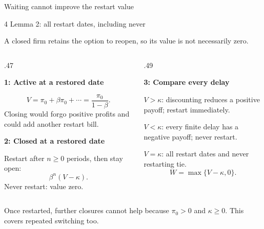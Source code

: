 \documentclass[aspectratio=169,11pt]{beamer}
\newcommand{\kwTurq}[1]{{\color{turquoise}#1}}
\newcommand{\labeltext}[1]{\par{\small\bfseries\color{blue}#1\par}\vspace{1.5mm}}
\newcommand{\takeaway}[1]{\par\vspace{2.5mm}\begingroup\setlength{\fboxsep}{2.5mm}\colorbox{pale}{\begin{minipage}{\dimexpr\linewidth-5mm\relax}\small\raggedright #1\end{minipage}}\endgroup\par}
\newcommand{\sectiontag}[1]{{\scriptsize\color{muted}#1\par}\vspace{2mm}}
\begin{document}
\begin{frame}{Waiting cannot improve the \kwTurq{restart value}}

\sectiontag{4 \textperiodcentered{} Lemma 2: all restart dates, including never}
{\small A closed firm retains the option to reopen, so its value is not necessarily zero.\par}\vspace{2mm}
\begin{columns}[T,onlytextwidth]
\begin{column}{.47\textwidth}
\labeltext{1: Active at a restored date}
\[V=\pi_0+\beta\pi_0+\cdots=\frac{\pi_0}{1-\beta}.\]
\small Closing would forgo positive profits and could add another restart bill.
\vspace{4mm}\labeltext{2: Closed at a restored date}
\small Restart after $n\geq0$ periods, then stay open:
\[\beta^n(V-\kappa).\]
Never restart: value zero.
\end{column}
\begin{column}{.49\textwidth}
\labeltext{3: Compare every delay}
\small $V>\kappa$: discounting reduces a positive payoff; restart immediately.\par\vspace{3mm}
$V<\kappa$: every finite delay has a negative payoff; never restart.\par\vspace{3mm}
$V=\kappa$: all restart dates and never restarting tie.
\vspace{3mm}\[\boxed{W=\max\{V-\kappa,0\}.}\]
\end{column}
\end{columns}
\takeaway{Once restarted, further closures cannot help because $\pi_0>0$ and $\kappa\geq0$. This covers repeated switching too.}

\end{frame}
\end{document}
